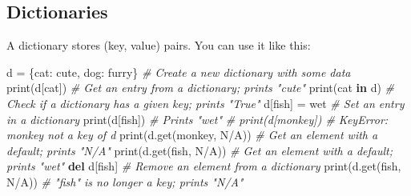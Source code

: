 \documentclass[
]{article}
\newenvironment{Shaded}{}{}
\newcommand{\BuiltInTok}[1]{#1}
\newcommand{\CommentTok}[1]{\textcolor[rgb]{0.38,0.63,0.69}{\textit{#1}}}
\newcommand{\KeywordTok}[1]{\textcolor[rgb]{0.00,0.44,0.13}{\textbf{#1}}}
\newcommand{\NormalTok}[1]{#1}
\newcommand{\OperatorTok}[1]{\textcolor[rgb]{0.40,0.40,0.40}{#1}}
\newcommand{\StringTok}[1]{\textcolor[rgb]{0.25,0.44,0.63}{#1}}
\begin{document}
\hypertarget{dictionaries}{%
\subsection{Dictionaries}\label{dictionaries}}

A dictionary stores (key, value) pairs. You can use it like this:

\begin{Shaded}
\begin{Highlighting}[]
\NormalTok{d }\OperatorTok{=}\NormalTok{ \{}\StringTok{\textquotesingle{}cat\textquotesingle{}}\NormalTok{: }\StringTok{\textquotesingle{}cute\textquotesingle{}}\NormalTok{, }\StringTok{\textquotesingle{}dog\textquotesingle{}}\NormalTok{: }\StringTok{\textquotesingle{}furry\textquotesingle{}}\NormalTok{\}  }\CommentTok{\# Create a new dictionary with some data}
\BuiltInTok{print}\NormalTok{(d[}\StringTok{\textquotesingle{}cat\textquotesingle{}}\NormalTok{])       }\CommentTok{\# Get an entry from a dictionary; prints "cute"}
\BuiltInTok{print}\NormalTok{(}\StringTok{\textquotesingle{}cat\textquotesingle{}} \KeywordTok{in}\NormalTok{ d)     }\CommentTok{\# Check if a dictionary has a given key; prints "True"}
\NormalTok{d[}\StringTok{\textquotesingle{}fish\textquotesingle{}}\NormalTok{] }\OperatorTok{=} \StringTok{\textquotesingle{}wet\textquotesingle{}}     \CommentTok{\# Set an entry in a dictionary}
\BuiltInTok{print}\NormalTok{(d[}\StringTok{\textquotesingle{}fish\textquotesingle{}}\NormalTok{])      }\CommentTok{\# Prints "wet"}
\CommentTok{\# print(d[\textquotesingle{}monkey\textquotesingle{}])  \# KeyError: \textquotesingle{}monkey\textquotesingle{} not a key of d}
\BuiltInTok{print}\NormalTok{(d.get(}\StringTok{\textquotesingle{}monkey\textquotesingle{}}\NormalTok{, }\StringTok{\textquotesingle{}N/A\textquotesingle{}}\NormalTok{))  }\CommentTok{\# Get an element with a default; prints "N/A"}
\BuiltInTok{print}\NormalTok{(d.get(}\StringTok{\textquotesingle{}fish\textquotesingle{}}\NormalTok{, }\StringTok{\textquotesingle{}N/A\textquotesingle{}}\NormalTok{))    }\CommentTok{\# Get an element with a default; prints "wet"}
\KeywordTok{del}\NormalTok{ d[}\StringTok{\textquotesingle{}fish\textquotesingle{}}\NormalTok{]         }\CommentTok{\# Remove an element from a dictionary}
\BuiltInTok{print}\NormalTok{(d.get(}\StringTok{\textquotesingle{}fish\textquotesingle{}}\NormalTok{, }\StringTok{\textquotesingle{}N/A\textquotesingle{}}\NormalTok{)) }\CommentTok{\# "fish" is no longer a key; prints "N/A"}
\end{Highlighting}
\end{Shaded}
\end{document}
